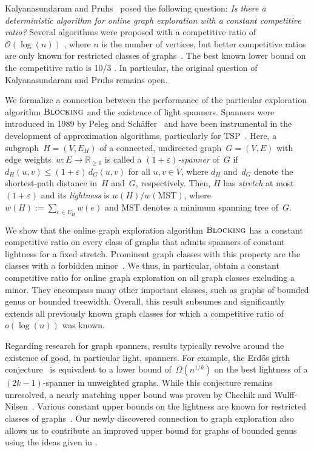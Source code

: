 \documentclass[a4paper,cleveref, autoref, thm-restate, thm-restate, UKenglish]{lipics-v2021}
\newcommand{\mst}{\mathrm{MST}}
\newcommand{\blocking}{\textsc{Blocking}}
\begin{document}
Kalyanasundaram and Pruhs~\cite{pruhs94} posed the following question: 
\emph{Is there a deterministic algorithm for online graph exploration with a constant competitive ratio?}
Several algorithms were proposed with a competitive ratio of $\mathcal{O} ( \log (n))$ \cite{megow, NN}, where $n$ is the number of vertices, but better competitive ratios are only known for restricted classes of graphs~\cite{pruhs94, megow, miyazaki}.
The best known lower bound on the competitive ratio is 10/3 \cite{birx}.
In particular, the original question of Kalyanasundaram and Pruhs remains open.

We formalize a connection between the performance of the particular exploration algorithm $\blocking$ and the  existence of light spanners.
Spanners were introduced in 1989 by Peleg and Schäffer~\cite{peleg} and have been instrumental in the development of approximation algorithms, particularly for TSP~\cite{arora, borradaile, minorspanner}.
Here, a subgraph~$H=(V,E_H)$ of a connected, undirected graph~$G=(V,E)$ with edge weights~$w\colon E \to \mathbb{R}_{\geq 0}$ is called a \emph{$(1+\varepsilon)$-spanner} of~$G$ if $d_H(u,v) \leq (1+\varepsilon)\,d_G(u,v)$ for all $u,v \in V$, where $d_H$ and~$d_G$ denote the shortest-path distance in~$H$ and~$G$, respectively.
Then, $H$ has \emph{stretch} at most $(1+\varepsilon)$ and its \emph{lightness} is $w(H)/w(\mst)$, where $w(H):=\sum_{e \in E_H} w(e)$ and $\mst$ denotes a minimum spanning tree of~$G$.

We show that the online graph exploration algorithm $ \blocking$ has a constant competitive ratio on every class of graphs that admits spanners of constant lightness for a fixed stretch.
Prominent graph classes with this property are the classes with a forbidden minor~\cite{minorspanner}.  
We thus, in particular, obtain a constant competitive ratio for online graph exploration on all graph classes excluding a minor.
They encompass many other important classes, such as graphs of bounded genus or bounded treewidth.
Overall, this result subsumes and significantly extends all previously known graph classes for which a competitive ratio of~$o(\log (n))$ was known.

Regarding research for graph spanners, results typically revolve around the existence of good, in particular light, spanners.
For example, the Erd\H{o}s girth conjecture~\cite{erdos} is equivalent to a lower bound of~$\Omega(n^{1/k})$ on the best lightness of a $(2k-1)$-spanner in unweighted graphs.
While this conjecture remains unresolved, a nearly matching upper bound was proven by Chechik and Wulff-Nilsen~\cite{chechik}.
Various constant upper bounds on the lightness are known for restricted classes of graphs~\cite{althoefer,  minorspanner, demainetreewidth, grigni}.
Our newly discovered connection to graph exploration also allows us to contribute an improved upper bound for graphs of bounded genus using the ideas given in \cite{megow}.
\end{document}
